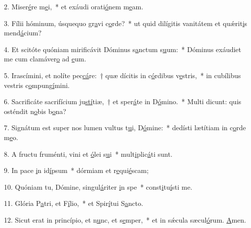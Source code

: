 2. Miser\uline{é}re m\uline{e}i,~* et exáudi orati\uline{ó}nem m\uline{e}am.\par 
3. Fílii hóminum, úsquequo gr\uline{a}vi c\uline{o}rde?~* ut quid dilígitis vanitátem et quǽrit\uline{i}s mend\uline{á}cium?\par 
4. Et scitóte quóniam mirificávit Dóminus s\uline{a}nctum s\uline{u}um:~* Dóminus exáudiet me cum clamáver\uline{o} ad \uline{e}um.\par 
5. Irascímini, et nolíte pec\uline{cá}re:~† quæ dícitis in c\uline{ó}rdibus v\uline{e}stris,~* in cubílibus vestris c\uline{o}mpung\uline{í}mini.\par 
6. Sacrificáte sacrifícium ju\uline{stí}tiæ,~† et sper\uline{á}te in D\uline{ó}mino.~* Multi dicunt: quis osténdit n\uline{o}bis b\uline{o}na?\par 
7. Signátum est super nos lumen vultus t\uline{u}i, D\uline{ó}mine:~* dedísti lætítiam in c\uline{o}rde m\uline{e}o.\par 
8. A fructu fruménti, vini et \uline{ó}lei s\uline{u}i~* mult\uline{i}plic\uline{á}ti sunt.\par 
9. In pace \uline{i}n id\uline{í}psum~* dórmiam et r\uline{e}qui\uline{é}scam;\par 
10. Quóniam tu, Dómine, singul\uline{á}riter \uline{i}n spe~* const\uline{i}tu\uline{í}sti me.\par 
11. Glória P\uline{a}tri, et F\uline{í}lio,~* et Spir\uline{í}tui S\uline{a}ncto.\par 
12. Sicut erat in princípio, et n\uline{u}nc, et s\uline{e}mper,~* et in sǽcula sæcul\uline{ó}rum. \uline{A}men.\par 
